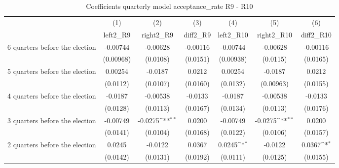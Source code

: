 \begin{table}[htbp]\centering
\def\sym#1{\ifmmode^{#1}\else\(^{#1}\)\fi}
\caption{Coefficients quarterly model acceptance\_rate R9 - R10}
\begin{tabular}{l*{6}{c}}
\hline\hline
                    &\multicolumn{1}{c}{(1)}&\multicolumn{1}{c}{(2)}&\multicolumn{1}{c}{(3)}&\multicolumn{1}{c}{(4)}&\multicolumn{1}{c}{(5)}&\multicolumn{1}{c}{(6)}\\
                    &\multicolumn{1}{c}{left2\_R9}&\multicolumn{1}{c}{right2\_R9}&\multicolumn{1}{c}{diff2\_R9}&\multicolumn{1}{c}{left2\_R10}&\multicolumn{1}{c}{right2\_R10}&\multicolumn{1}{c}{diff2\_R10}\\
\hline
 6 quarters before the election&    -0.00744         &    -0.00628         &    -0.00116         &    -0.00744         &    -0.00628         &    -0.00116         \\
                    &   (0.00968)         &    (0.0108)         &    (0.0151)         &   (0.00938)         &    (0.0115)         &    (0.0165)         \\
[1em]
 5 quarters before the election&     0.00254         &     -0.0187         &      0.0212         &     0.00254         &     -0.0187         &      0.0212         \\
                    &    (0.0112)         &    (0.0107)         &    (0.0160)         &    (0.0132)         &   (0.00963)         &    (0.0155)         \\
[1em]
 4 quarters before the election&     -0.0187         &    -0.00538         &     -0.0133         &     -0.0187         &    -0.00538         &     -0.0133         \\
                    &    (0.0128)         &    (0.0113)         &    (0.0167)         &    (0.0134)         &    (0.0113)         &    (0.0176)         \\
[1em]
 3 quarters before the election&    -0.00749         &     -0.0275\sym{**} &      0.0200         &    -0.00749         &     -0.0275\sym{**} &      0.0200         \\
                    &    (0.0141)         &    (0.0104)         &    (0.0168)         &    (0.0122)         &    (0.0106)         &    (0.0157)         \\
[1em]
 2 quarters before the election&      0.0245         &     -0.0122         &      0.0367         &      0.0245\sym{*}  &     -0.0122         &      0.0367\sym{*}  \\
                    &    (0.0142)         &    (0.0131)         &    (0.0192)         &    (0.0111)         &    (0.0125)         &    (0.0155)         \\

\end{tabular}
\end{table}

